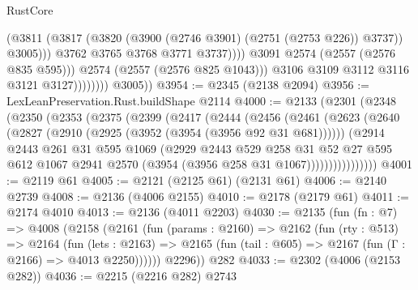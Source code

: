 \begin{lexlean}{RustCore}
\begin{coremodule}
                                      (@3811
                                        (@3817
                                          (@3820 (@3900 (@2746 @3901) (@2751 (@2753 @226)) @3737))
                                          @3005)))
                                    @3762
                                    @3765
                                    @3768
                                    @3771
                                    @3737))))
                            @3091
                            @2574
                            (@2557 (@2576 @835 @595)))
                          @2574
                          (@2557 (@2576 @825 @1043)))
                        @3106
                        @3109
                        @3112
                        @3116
                        @3121
                        @3127))))))))
        @3005))
@3954 := @2345 (@2138 @2094)
@3956 := LexLeanPreservation.Rust.buildShape @2114
@4000 := @2133
    (@2301
      (@2348
        (@2350
          (@2353
            (@2375
              (@2399
                (@2417
                  (@2444
                    (@2456
                      (@2461
                        (@2623
                          (@2640
                            (@2827 (@2910 (@2925 (@3952 (@3954 (@3956 @92 @31 @681))))))
                            (@2914
                              @2443
                              @261
                              @31
                              @595
                              @1069
                              (@2929
                                @2443
                                @529
                                @258
                                @31
                                @52
                                @27
                                @595
                                @612
                                @1067
                                @2941
                                @2570
                                (@3954 (@3956 @258 @31 @1067))))))))))))))))
@4001 := @2119 @61
@4005 := @2121 (@2125 @61) (@2131 @61)
@4006 := @2140 @2739
@4008 := @2136 (@4006 @2155)
@4010 := @2178 (@2179 @61)
@4011 := @2174 @4010
@4013 := @2136 (@4011 @2203)
@4030 := @2135
    (fun (fn : @7) =>
    @4008
      (@2158
        (@2161
          (fun (params : @2160) =>
          @2162
            (fun (rty : @513) =>
            @2164
              (fun (lets : @2163) =>
              @2165 (fun (tail : @605) => @2167 (fun (Γ : @2166) => @4013 @2250))))))
        @2296))
    @282
@4033 := @2302 (@4006 (@2153 @282))
@4036 := @2215 (@2216 @282) @2743

\end{coremodule}
\end{lexlean}
